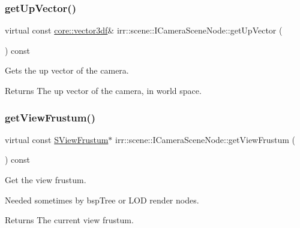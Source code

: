 \subsubsection{\texorpdfstring{get\+Up\+Vector()}{getUpVector()}\hspace{0.1cm}{\footnotesize\ttfamily [2/2]}}
{\footnotesize\ttfamily virtual const \hyperlink{namespaceirr_1_1core_ae6e2b2a6c552833ebbd5b7463d03586b}{core\+::vector3df}\& irr\+::scene\+::\+I\+Camera\+Scene\+Node\+::get\+Up\+Vector (\begin{DoxyParamCaption}{ }\end{DoxyParamCaption}) const\hspace{0.3cm}{\ttfamily [pure virtual]}}



Gets the up vector of the camera. 

\begin{DoxyReturn}{Returns}
The up vector of the camera, in world space. 
\end{DoxyReturn}
\mbox{\label{classirr_1_1scene_1_1ICameraSceneNode_add0cba097d3e59714546f04f2c53477e}} 
\subsubsection{\texorpdfstring{get\+View\+Frustum()}{getViewFrustum()}\hspace{0.1cm}{\footnotesize\ttfamily [1/2]}}
{\footnotesize\ttfamily virtual const \hyperlink{structirr_1_1scene_1_1SViewFrustum}{S\+View\+Frustum}$\ast$ irr\+::scene\+::\+I\+Camera\+Scene\+Node\+::get\+View\+Frustum (\begin{DoxyParamCaption}{ }\end{DoxyParamCaption}) const\hspace{0.3cm}{\ttfamily [pure virtual]}}



Get the view frustum. 

Needed sometimes by bsp\+Tree or L\+OD render nodes. \begin{DoxyReturn}{Returns}
The current view frustum. 
\end{DoxyReturn}
\mbox{\label{classirr_1_1scene_1_1ICameraSceneNode_add0cba097d3e59714546f04f2c53477e}} 
